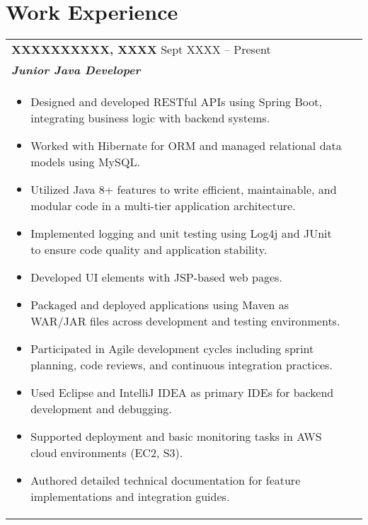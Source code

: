 \documentclass[a4paper,8pt]{article}
\begin{document}
\section{Work Experience}
\begin{tabularx}{\linewidth}{ @{}l r@{} }
\textbf{XXXXXXXXXX, XXXX} \hfill \color[HTML]{371e77} Sept XXXX -- Present \\[5pt]
\color[HTML]{371e77}\textbf{\textit{Junior Java Developer}}\ \hfill \color[HTML]{4B28A4} \\[6pt]
\begin{minipage}[t]{\linewidth}
    \begin{itemize}[nosep,after=\strut, leftmargin=2em, itemsep=3pt]
    \item Designed and developed RESTful APIs using Spring Boot, integrating business logic with backend systems.
    \item Worked with Hibernate for ORM and managed relational data models using MySQL.
    \item Utilized Java 8+ features to write efficient, maintainable, and modular code in a multi-tier application architecture.
    \item Implemented logging and unit testing using Log4j and JUnit to ensure code quality and application stability.
    \item Developed UI elements with JSP-based web pages.
    \item Packaged and deployed applications using Maven as WAR/JAR files across development and testing environments.
    \item Participated in Agile development cycles including sprint planning, code reviews, and continuous integration practices.
    \item Used Eclipse and IntelliJ IDEA as primary IDEs for backend development and debugging.
    \item Supported deployment and basic monitoring tasks in AWS cloud environments (EC2, S3).
    \item Authored detailed technical documentation for feature implementations and integration guides.
\end{itemize}
\end{minipage}
\end{tabularx}


\vspace{10pt}
\end{document}
